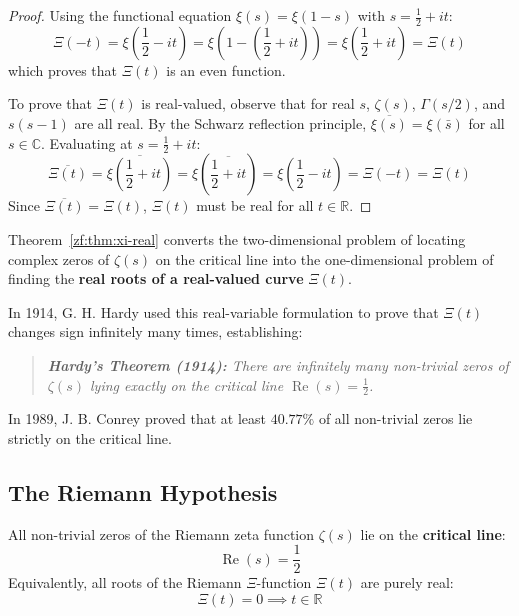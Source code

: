 \documentclass[a4paper]{article}
\begin{document}
\begin{proof}
Using the functional equation $\xi(s) = \xi(1-s)$ with $s = \frac{1}{2} + it$:
\begin{equation*}
    \Xi(-t) = \xi\left(\frac{1}{2} - it\right) = \xi\left(1 - \left(\frac{1}{2} + it\right)\right) = \xi\left(\frac{1}{2} + it\right) = \Xi(t)
\end{equation*}
which proves that $\Xi(t)$ is an even function.

To prove that $\Xi(t)$ is real-valued, observe that for real $s$, $\zeta(s)$, $\Gamma(s/2)$, and $s(s-1)$ are all real. By the Schwarz reflection principle, $\overline{\xi(s)} = \xi(\bar{s})$ for all $s \in \mathbb{C}$. Evaluating at $s = \frac{1}{2} + it$:
\begin{equation*}
    \overline{\Xi(t)} = \overline{\xi\left(\frac{1}{2} + it\right)} = \xi\left(\overline{\frac{1}{2} + it}\right) = \xi\left(\frac{1}{2} - it\right) = \Xi(-t) = \Xi(t)
\end{equation*}
Since $\overline{\Xi(t)} = \Xi(t)$, $\Xi(t)$ must be real for all $t \in \mathbb{R}$.
\end{proof}

\begin{remark}
Theorem~\ref{zf:thm:xi-real} converts the two-dimensional problem of locating complex zeros of $\zeta(s)$ on the critical line into the one-dimensional problem of finding the \textbf{real roots of a real-valued curve} $\Xi(t)$.

In 1914, G. H. Hardy used this real-variable formulation to prove that $\Xi(t)$ changes sign infinitely many times, establishing:
\begin{quote}
\textit{\textbf{Hardy's Theorem (1914):} There are infinitely many non-trivial zeros of $\zeta(s)$ lying exactly on the critical line $\operatorname{Re}(s) = \frac{1}{2}$.}
\end{quote}
In 1989, J. B. Conrey proved that at least $40.77\%$ of all non-trivial zeros lie strictly on the critical line.
\end{remark}

\subsection{The Riemann Hypothesis}\label{zf:subsec:riemann-hypothesis-statement}

\begin{tcolorbox}[colback=blue!5!white,colframe=blue!75!black,title=\textbf{The Riemann Hypothesis (Bernhard Riemann, 1859)}]
All non-trivial zeros of the Riemann zeta function $\zeta(s)$ lie on the \textbf{critical line}:
\begin{equation}
    \boxed{\operatorname{Re}(s) = \frac{1}{2}}
\end{equation}
Equivalently, all roots of the Riemann $\Xi$-function $\Xi(t)$ are purely real:
\begin{equation}
    \Xi(t) = 0 \implies t \in \mathbb{R}
\end{equation}
\end{tcolorbox}
\end{document}
